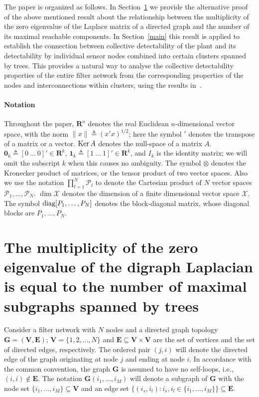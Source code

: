 \documentclass[a4paper,10pt,conference]{ieeeconf}
\begin{document}
The paper is organized as follows. In Section~\ref{Kirchhoff} we provide
the alternative proof of the above mentioned result about the relationship
between the multiplicity of the zero eigenvalue of the Laplace matrix of
a directed graph and the number of its maximal reachable components. In
Section~\ref{main} this result is  
applied to establish the connection between collective detectability of the
plant and its detectability by individual sensor nodes combined into certain
clusters spanned by trees. This provides a natural
way to analyse the collective detectability properties of the entire filter
network from the corresponding properties of the nodes and
interconnections within clusters, using the results in~\cite{U7b-journal}.

\paragraph*{Notation} Throughout the paper, $\mathbf{R}^n$ denotes the real
Euclidean $n$-dimensional vector space, with the norm $\|x\|\triangleq
(x'x)^{1/2}$; here the symbol $'$ denotes the transpose of a matrix or a
vector. $\mathop{\mathrm{Ker}}\nolimits A$ denotes the null-space of a matrix $A$. 
$\mathbf{0}_k\triangleq [0~\ldots~0]'\in \mathbf{R}^k$, 
$\mathbf{1}_k\triangleq [1~\ldots~1]'\in \mathbf{R}^k$, and
$I_k$ is the identity matrix; we will omit the
subscript $k$ when this causes no ambiguity. 
The symbol $\otimes$
  denotes the Kronecker product of matrices, or the tensor product of two
  vector spaces. Also we use the notation $\prod_{l=1}^N\mathcal{P}_l$ to
  denote the Cartesian product of $N$ vector spaces $\mathcal{P}_1,
  \ldots,  \mathcal{P}_N$. $\dim\mathcal{X}$ denotes the dimension of a
  finite dimensional vector space $\mathcal{X}$. The symbol $\mathop{\mathrm{diag}}\nolimits[P_1,\ldots,P_N]$
  denotes the block-diagonal matrix, whose  diagonal
  blocks are $P_1,\ldots,P_N$.     

\section{The multiplicity of the zero eigenvalue of the digraph Laplacian is
  equal to the number of maximal subgraphs spanned by trees}\label{Kirchhoff}
 
Consider a filter network with 
$N$ nodes and a directed graph topology $\mathbf{G} = (\mathbf{V},\mathbf{E})$;
$\mathbf{V}=\{1,2,\ldots,N\}$ and $\mathbf{E}\subseteq \mathbf{V}\times \mathbf{V}$ are the set of vertices and the
set of directed edges, 
respectively. The ordered pair $(j,i)$ will denote the directed edge
of the graph originating at node $j$ and ending at node $i$. In accordance
with the common convention, the graph $\mathbf{G}$ is assumed to have no
self-loops, i.e., 
$(i,i)\not\in \mathbf{E}$. The notation $\mathbf{G}(i_1,\ldots,i_M)$ will
denote a subgraph of $\mathbf{G}$ with the node set
$\{i_1,\ldots,i_M\}\subseteq \mathbf{V}$ and an edge set
$\{(i_s,i_l):i_s,i_l\in \{i_1,\ldots,i_M\}\}\subseteq \mathbf{E}$.    
\end{document}
